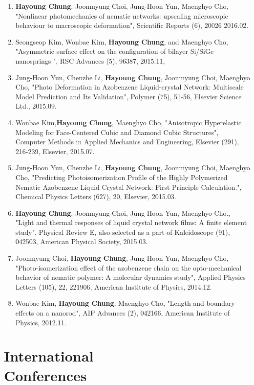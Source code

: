 \documentclass[margin, 10pt]{res} %
\begin{document}
\begin{resume}
\begin{enumerate}
    \item \textbf{Hayoung Chung}, Joonmyung Choi, Jung-Hoon Yun, Maenghyo Cho, "Nonlinear photomechanics of nematic networks: upscaling microscopic behaviour to macroscopic deformation", Scientific Reports (6), 20026 2016.02. %
    \item Seongseop Kim, Wonbae Kim, \textbf{Hayoung Chung}, and Maenghyo Cho, "Asymmetric surface effect on the configuration of bilayer Si/SiGe nanosprings ", RSC Advances (5), 96387, 2015.11,  %
    \item Jung-Hoon Yun, Chenzhe Li, \textbf{Hayoung Chung}, Joonmyung Choi, Maenghyo Cho, "Photo Deformation in Azobenzene Liquid-crystal Network: Multiscale Model Prediction and Its Validation", Polymer (75), 51-56, Elsevier Science Ltd., 2015.09. %
    \item Wonbae Kim,\textbf{Hayoung Chung}, Maenghyo Cho, "Anisotropic Hyperelastic Modeling for Face-Centered Cubic and Diamond Cubic Structures", Computer Methods in Applied Mechanics and Engineering, Elsevier (291), 216-239, Elsevier, 2015.07. %
    \item Jung-Hoon Yun, Chenzhe Li, \textbf{Hayoung Chung}, Joonmyung Choi, Maenghyo Cho, "Predicting Photoisomerization Profile of the Highly Polymerized Nematic Azobenzene Liquid Crystal Network: First Principle Calculation.", Chemical Physics Letters (627), 20, Elsevier, 2015.03. %
    \item \textbf{Hayoung Chung}, Joonmyung Choi, Jung-Hoon Yun, Maenghyo Cho., "Light and thermal responses of liquid crystal network films: A finite element study", Physical Review E, also selected as a part of Kaleidoscope (91), 042503, American Physical Society, 2015.03. %
    \item Joonmyung Choi, \textbf{Hayoung Chung}, Jung-Hoon Yun, Maenghyo Cho, "Photo-isomerization effect of the azobenzene chain on the opto-mechanical behavior of nematic polymer: A molecular dynamics study", Applied Physics Letters (105), 22, 221906, American Institute of Physics, 2014.12.  %
    \item Wonbae Kim, \textbf{Hayoung Chung}, Maenghyo Cho, "Length and boundary effects on a nanorod", AIP Advances (2), 042166, American Institute of Physics, 2012.11.
    
\end{enumerate}

\section{International \\ Conferences}


\end{resume}
\end{document}
